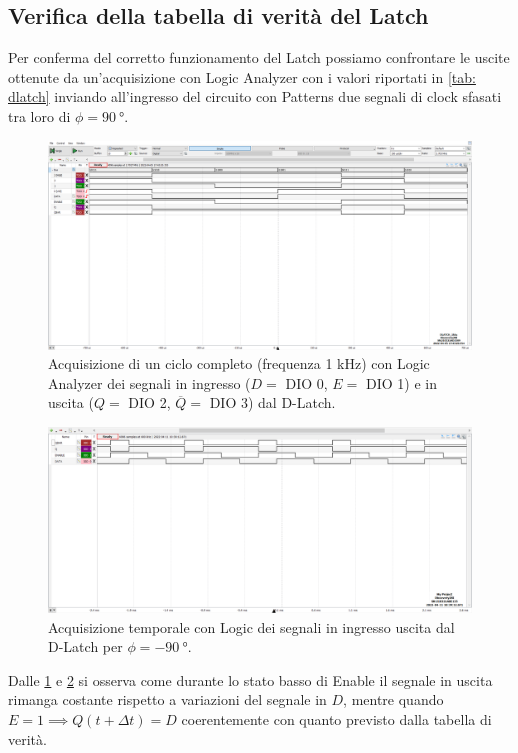 \documentclass[10pt, a4paper, italian]{article}
\begin{document}
\subsection{Verifica della tabella di verità del Latch}
Per conferma del corretto funzionamento del Latch possiamo confrontare
le uscite ottenute da un'acquisizione con Logic Analyzer con i valori
riportati in \cref{tab: dlatch} inviando all'ingresso del circuito con
Patterns due segnali di clock sfasati tra loro di $\phi = \SI{90}{\degree}$.
\begin{figure}[htbp]
    \centering
    \includegraphics[width=\textwidth]{dlatch}
    \caption{Acquisizione di un ciclo completo (frequenza 1 kHz) con Logic
    Analyzer dei segnali in ingresso ($D =$ DIO 0, $E =$ DIO 1) e in uscita
    ($Q =$ DIO 2, $\overline{Q} =$ DIO 3) dal D-Latch.
    \label{fig: dlatch}}
\end{figure}
\begin{figure}[htbp]
	\includegraphics[width=\textwidth]{latch2}
	\caption{Acquisizione temporale con Logic dei segnali in ingresso uscita dal
	D-Latch per $\phi = -\SI{90}{\degree}$.
	\label{fig: Log_DLATCH2}}
\end{figure}

Dalle \cref{fig: dlatch} e \cref{fig: Log_DLATCH2} si osserva come durante lo
stato basso di Enable il segnale in uscita rimanga costante rispetto a
variazioni del segnale in $D$, mentre quando
$E = 1 \implies Q(t + \Delta t) = D$ coerentemente con quanto previsto dalla
tabella di verità.
\end{document}
